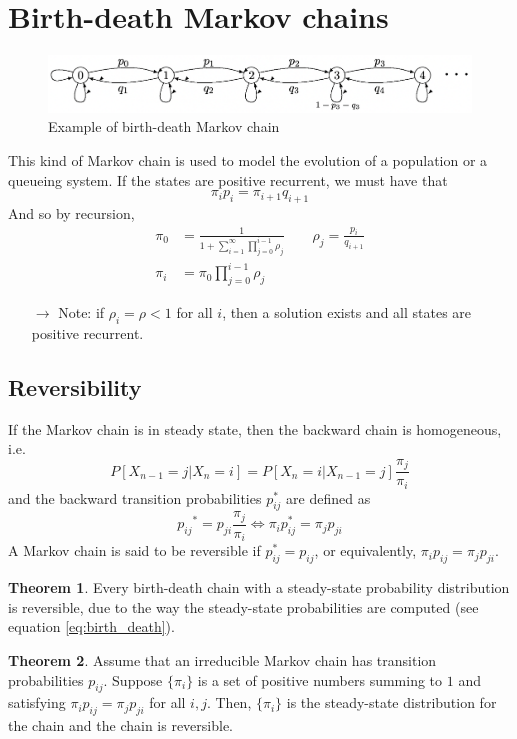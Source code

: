 \documentclass[12pt, openany]{report}
\theoremstyle{definition}
\newtheorem{thm}{Theorem}[chapter]
\begin{document}
\section{Birth-death Markov chains}
\begin{figure}[H]
	\centering
	\includegraphics[width=.8\textwidth]{img/bd_markov_chain.png}
	\caption{Example of birth-death Markov chain}
	\label{fig:birth_death}
\end{figure}
This kind of Markov chain is used to model the evolution of a population or a queueing system. If the states are positive recurrent, we must have that 
\begin{equation}\label{eq:birth_death}
	\pi_i p_i = \pi_{i+1}q_{i+1}
\end{equation}
And so by recursion, 
\begin{equation}
	\begin{aligned}
		\pi_0 &= \frac{1}{1+\sum_{i=1}^\infty \prod_{j=0}^{i-1}\rho_j}\qquad \rho_j = \frac{p_i}{q_{i+1}}\\
		\pi_i &= \pi_0 \prod_{j=0}^{i-1}\rho_j
	\end{aligned}
\end{equation}
\begin{itemize}
	\item [$\to$] Note: if $\rho_i=\rho<1$ for all $i$, then a solution exists and all states are positive recurrent.
\end{itemize}
\subsection{Reversibility}
If the Markov chain is in steady state, then the backward chain is homogeneous, i.e.
\begin{equation}
	P[X_{n-1} = j|X_n=i] = P[X_{n} = i|X_{n-1}=j]\frac{\pi_j}{\pi_i}
\end{equation}
and the backward transition probabilities $p_{ij}^*$ are defined as 
\begin{equation}
	p_{ij}{^*} = p_{ji}\frac{\pi_j}{\pi_i} \Longleftrightarrow \pi_i p_{ij}^* = \pi_j p_{ji}
\end{equation}
A Markov chain is said to be reversible if $p_{ij}^* = p_{ij}$, or equivalently, $\pi_i p_{ij} = \pi_j p_{ji}$.
\begin{thm}
	Every birth-death chain with a steady-state probability distribution is reversible, due to the way the steady-state probabilities are computed (see equation \eqref{eq:birth_death}).
\end{thm}
\begin{thm}
	Assume that an irreducible Markov chain has transition probabilities $p_{ij}$. Suppose $\{\pi_i\}$ is a set of positive numbers summing to $1$ and satisfying $\pi_i p_{ij}= \pi_j p_{ji}$ for all $i,j$. Then, $\{\pi_i\}$ is the steady-state distribution for the chain and the chain is reversible. 
\end{thm}
\end{document}
